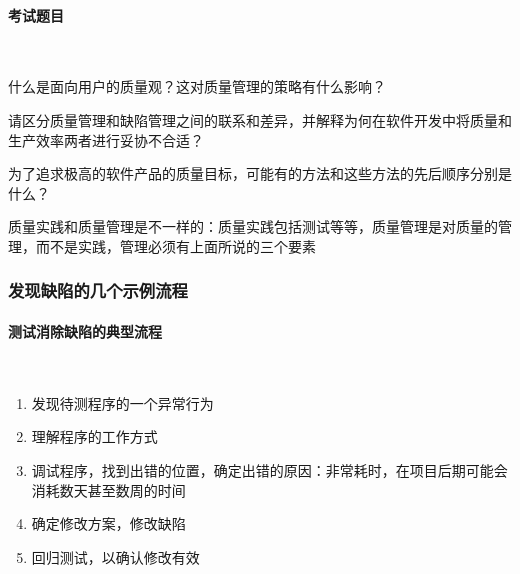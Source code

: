 \paragraph{考试题目}~{} \par
\begin{problem}
什么是面向用户的质量观？这对质量管理的策略有什么影响？
\end{problem}

\begin{problem}
请区分质量管理和缺陷管理之间的联系和差异，并解释为何在软件开发中将质量和生产效率两者进行妥协不合适？
\end{problem}

\begin{problem}
为了追求极高的软件产品的质量目标，可能有的方法和这些方法的先后顺序分别是什么？
\end{problem}

\begin{problem}
质量实践和质量管理是不一样的：质量实践包括测试等等，质量管理是对质量的管理，而不是实践，管理必须有上面所说的三个要素
\end{problem}

\subsubsection{发现缺陷的几个示例流程}

\paragraph{测试消除缺陷的典型流程}~{} \par
\vspace{-0.8em}
\begin{multicols}{2}
    \begin{enumerate}[label=\arabic*.]
        \item 发现待测程序的一个异常行为
        \item 理解程序的工作方式
        \item 调试程序，找到出错的位置，确定出错的原因：非常耗时，在项目后期可能会消耗数天甚至数周的时间
        \item 确定修改方案，修改缺陷
        \item 回归测试，以确认修改有效
    \end{enumerate}
\end{multicols}
\vspace{-1em}

